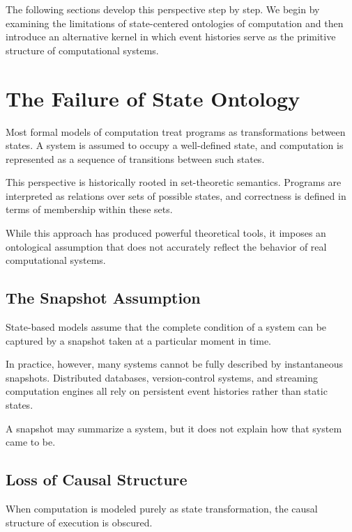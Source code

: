 \documentclass[12pt]{article}
\begin{document}
The following sections develop this perspective step by step.
We begin by examining the limitations of state-centered
ontologies of computation and then introduce an alternative
kernel in which event histories serve as the primitive
structure of computational systems.


\section{The Failure of State Ontology}

Most formal models of computation treat programs as transformations
between states. A system is assumed to occupy a well-defined state,
and computation is represented as a sequence of transitions between
such states.

This perspective is historically rooted in set-theoretic semantics.
Programs are interpreted as relations over sets of possible states,
and correctness is defined in terms of membership within these sets.

While this approach has produced powerful theoretical tools,
it imposes an ontological assumption that does not accurately
reflect the behavior of real computational systems.

\subsection{The Snapshot Assumption}

State-based models assume that the complete condition of a system
can be captured by a snapshot taken at a particular moment in time.

In practice, however, many systems cannot be fully described
by instantaneous snapshots. Distributed databases, version-control
systems, and streaming computation engines all rely on persistent
event histories rather than static states.

A snapshot may summarize a system, but it does not explain
how that system came to be.

\subsection{Loss of Causal Structure}

When computation is modeled purely as state transformation,
the causal structure of execution is obscured.
\end{document}
